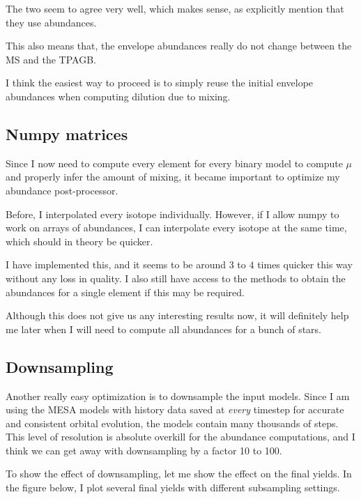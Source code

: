 \documentclass[a4paper,10pt]{article}
\begin{document}
The two seem to agree very well, which makes sense, as \citet{karakas2016} explicitly mention that
they use \citet{asplund2009} abundances.

This also means that, the envelope
abundances really do not change between the MS and the TPAGB.

I think the easiest way to proceed is to simply reuse the initial envelope abundances when computing dilution due to mixing.


\subsection{Numpy matrices}
Since I now need to compute every element for every binary model to compute \(\mu \) and properly
infer the amount of mixing, it became important to optimize my abundance post-processor.

Before, I interpolated every isotope individually. However, if I allow numpy to work on arrays of
abundances, I can interpolate every isotope at the same time, which should in theory be quicker.

I have implemented this, and it seems to be around \(3\) to \(4\) times quicker this way without
any loss in quality. I also still have access to the methods to obtain the abundances for a
single element if this may be required.

Although this does not give us any interesting results now, it will definitely help me later when
I will need to compute all abundances for a bunch of stars.
\subsection{Downsampling}

Another really easy optimization is to downsample the input models. Since I am using
the MESA models with history data saved at \emph{every} timestep for accurate and consistent
orbital evolution, the models contain many thousands of steps.
This level of resolution is absolute overkill for the abundance computations, and I think we can get
away with downsampling by a factor 10 to 100.

To show the effect of downsampling, let me show the effect on the final yields.
In the figure below, I plot several final yields with different subsampling settings.
\begin{figure}[ht]
    \centering
\end{figure}
\end{document}
